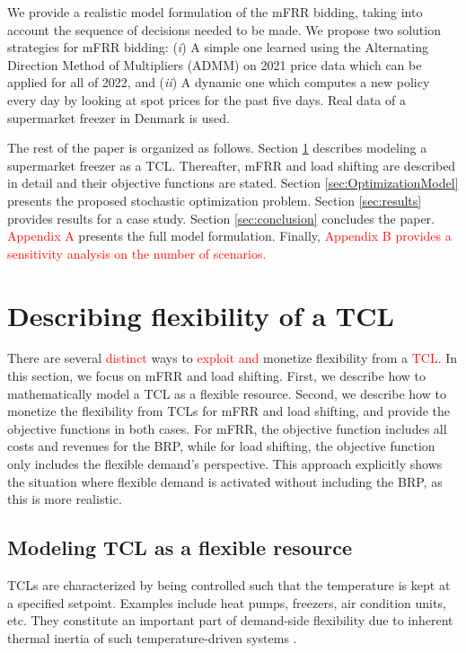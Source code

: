\documentclass[11pt,a4paper]{article}
\begin{document}
We provide a realistic model formulation of the mFRR bidding, taking into account the sequence of decisions needed to be made. We propose two solution strategies for mFRR bidding: (\textit{i}) A simple one learned using the Alternating Direction Method of Multipliers (ADMM) on 2021 price data which can be applied for all of 2022, and (\textit{ii}) A dynamic one which computes a new policy every day by looking at spot prices for the past five days. Real data of a supermarket freezer  in Denmark is used.


The rest of the paper is organized as follows. Section \ref{sec:monetizing_flex} describes modeling a supermarket freezer as a TCL. Thereafter, mFRR and load shifting are described in detail and their objective functions are stated. Section \ref{sec:OptimizationModel} presents the proposed stochastic optimization problem.
Section \ref{sec:results} provides  results for a case study. Section \ref{sec:conclusion} concludes the paper.  \textcolor{red}{Appendix A} presents the full model formulation. Finally, \textcolor{red}{Appendix B provides a sensitivity analysis on the number of scenarios.} 

\section{Describing flexibility of a TCL}\label{sec:monetizing_flex}

There are several \textcolor{red}{distinct} ways to \textcolor{red}{exploit and} monetize flexibility from a \textcolor{red}{TCL}. In this section, we focus on mFRR and load shifting. First, we describe how to mathematically model a TCL as a flexible resource. Second, we describe how to monetize the flexibility from TCLs for mFRR and load shifting, and provide the objective functions in both cases. 
For mFRR, the objective function includes all costs and revenues for the BRP, while for load shifting, the objective function only includes the flexible demand's perspective. This approach explicitly shows the situation where flexible demand is activated without including the BRP, as this is more realistic.

\subsection{Modeling TCL as a flexible resource}
%
TCLs are characterized by being controlled such that the temperature is kept at a specified setpoint. Examples include heat pumps, freezers, air condition units, etc. They constitute an important part of demand-side flexibility due to  inherent thermal inertia of such temperature-driven systems \textcolor{red}{\cite{koch2011modeling,hao2014aggregate}}.
\end{document}
